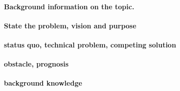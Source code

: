 \paragraph{Background information on the topic.}
\paragraph{State the problem, vision and purpose}
\paragraph{status quo, technical problem, competing solution}
\paragraph{obstacle, prognosis}
\paragraph{background knowledge}